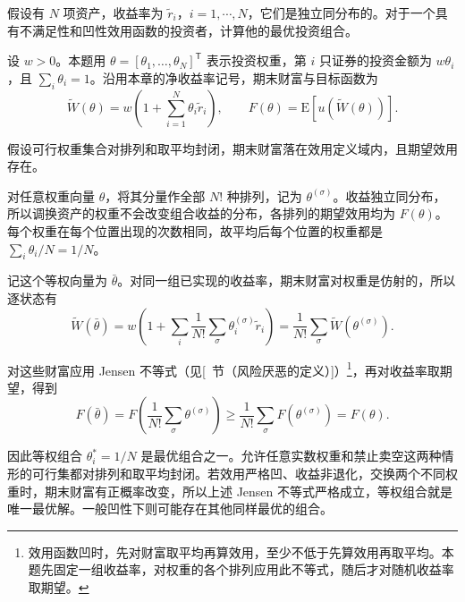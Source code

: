 
\begin{samepage}
\begin{problem}
 假设有 $N$ 项资产，收益率为 $\tilde{r}_{i}$，$i=1,\cdots,N$，它们是独立同分布的。对于一个具有不满足性和凹性效用函数的投资者，计算他的最优投资组合。
\end{problem}
\end{samepage}
\begin{solution}[blank-type=manual,blank-vsep=7\baselineskip]
设 $w>0$。本题用 $\theta=[\theta_1,\ldots,\theta_N]^{\mathsf T}$ 表示投资权重，第 $i$ 只证券的投资金额为 $w\theta_i$，且 $\sum_i\theta_i=1$。沿用本章的净收益率记号，期末财富与目标函数为
\[
 \widetilde W(\theta)=w\left(1+\sum_{i=1}^N\theta_i\tilde r_i\right),\qquad
 F(\theta)=\mathrm E[u(\widetilde W(\theta))].
\]

假设可行权重集合对排列和取平均封闭，期末财富落在效用定义域内，且期望效用存在。

对任意权重向量 $\theta$，将其分量作全部 $N!$ 种排列，记为 $\theta^{(\sigma)}$。收益独立同分布，所以调换资产的权重不会改变组合收益的分布，各排列的期望效用均为 $F(\theta)$。每个权重在每个位置出现的次数相同，故平均后每个位置的权重都是 $\sum_i\theta_i/N=1/N$。

记这个等权向量为 $\bar\theta$。对同一组已实现的收益率，期末财富对权重是仿射的，所以逐状态有
\[
 \widetilde W(\bar\theta)
 =w\left(1+\sum_i\frac1{N!}\sum_\sigma
             \theta_i^{(\sigma)}\tilde r_i\right)
 =\frac1{N!}\sum_\sigma\widetilde W(\theta^{(\sigma)}).
\]

对这些财富应用 Jensen 不等式\ifdefined\WJHandoutKnowledge（见[~节（风险厌恶的定义）]）\fi\footnote{效用函数凹时，先对财富取平均再算效用，至少不低于先算效用再取平均。本题先固定一组收益率，对权重的各个排列应用此不等式，随后才对随机收益率取期望。}，再对收益率取期望，得到
\[
 F(\bar\theta)
 =F\left(\frac1{N!}\sum_\sigma\theta^{(\sigma)}\right)
 \ge\frac1{N!}\sum_\sigma F(\theta^{(\sigma)})
 =F(\theta).
\]

因此等权组合 $\theta_i^*=1/N$ 是最优组合之一。允许任意实数权重和禁止卖空这两种情形的可行集都对排列和取平均封闭。若效用严格凹、收益非退化，交换两个不同权重时，期末财富有正概率改变，所以上述 Jensen 不等式严格成立，等权组合就是唯一最优解。一般凹性下则可能存在其他同样最优的组合。\qedhere
\end{solution}

